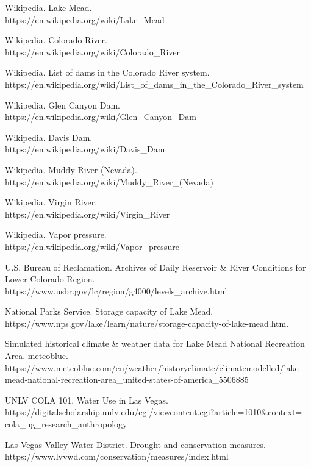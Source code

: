 \documentclass[12pt]{article}
\theoremstyle{definition}
\theoremstyle{remark}
\numberwithin{equation}{section}
\begin{document}
\begin{thebibliography}{100}
	 Wikipedia. Lake Mead.\\ https://en.wikipedia.org/wiki/Lake\_Mead

	 Wikipedia. Colorado River.\\ https://en.wikipedia.org/wiki/Colorado\_River

	 Wikipedia. List of dams in the Colorado River system.\\ https://en.wikipedia.org/wiki/List\_of\_dams\_in\_the\_Colorado\_River\_system

	 Wikipedia. Glen Canyon Dam.\\ https://en.wikipedia.org/wiki/Glen\_Canyon\_Dam

	 Wikipedia. Davis Dam.\\ https://en.wikipedia.org/wiki/Davis\_Dam

	 Wikipedia. Muddy River (Nevada).\\ https://en.wikipedia.org/wiki/Muddy\_River\_(Nevada)

	 Wikipedia. Virgin River.\\ https://en.wikipedia.org/wiki/Virgin\_River

	 Wikipedia. Vapor pressure.\\ https://en.wikipedia.org/wiki/Vapor\_pressure

	 U.S. Bureau of Reclamation. Archives of Daily Reservoir \& River Conditions for Lower Colorado Region.\\ https://www.usbr.gov/lc/region/g4000/levels\_archive.html

	 National Parks Service. Storage capacity of Lake Mead.\\ https://www.nps.gov/lake/learn/nature/storage-capacity-of-lake-mead.htm.

	 Simulated historical climate \& weather data for Lake Mead National Recreation Area. meteoblue.\\ https://www.meteoblue.com/en/weather/historyclimate/climatemodelled/lake-mead-national-recreation-area\_united-states-of-america\_5506885

	 UNLV COLA 101. Water Use in Las Vegas.\\ https://digitalscholarship.unlv.edu/cgi/viewcontent.cgi?article=1010\&context= cola\_ug\_research\_anthropology

	 Las Vegas Valley Water District. Drought and conservation measures.\\ https://www.lvvwd.com/conservation/measures/index.html

\end{thebibliography}
	
\end{document}
